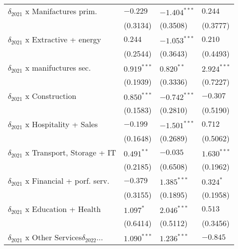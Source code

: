 \begin{tabular}{llll}
$\delta_{2021}$ x Manifactures prim.               &           $-0.229$ &     $-1.404^{***}$ &            $0.244$ \\
                                                   &           (0.3134) &           (0.3508) &           (0.3777) \\
$\delta_{2021}$ x Extractive + energy              &            $0.244$ &     $-1.053^{***}$ &            $0.210$ \\
                                                   &           (0.2544) &           (0.3643) &           (0.4493) \\
$\delta_{2021}$ x manifuctures sec.                &      $0.919^{***}$ &       $0.820^{**}$ &      $2.924^{***}$ \\
                                                   &           (0.1939) &           (0.3336) &           (0.7227) \\
$\delta_{2021}$ x Construction                     &      $0.850^{***}$ &     $-0.742^{***}$ &           $-0.307$ \\
                                                   &           (0.1583) &           (0.2810) &           (0.5190) \\
$\delta_{2021}$ x Hospitality + Sales              &           $-0.199$ &     $-1.501^{***}$ &            $0.712$ \\
                                                   &           (0.1648) &           (0.2689) &           (0.5062) \\
$\delta_{2021}$ x Transport, Storage + IT          &       $0.491^{**}$ &           $-0.035$ &      $1.630^{***}$ \\
                                                   &           (0.2185) &           (0.6508) &           (0.1962) \\
$\delta_{2021}$ x Financial + porf. serv.          &           $-0.379$ &      $1.385^{***}$ &          $0.324^*$ \\
                                                   &           (0.3155) &           (0.1895) &           (0.1958) \\
$\delta_{2021}$ x Education + Health               &          $1.097^*$ &      $2.046^{***}$ &            $0.513$ \\
                                                   &           (0.6414) &           (0.5112) &           (0.3456) \\
$\delta_{2021}$ x Other Services$\delta_{2022}$... &      $1.090^{***}$ &      $1.236^{***}$ &           $-0.845$ \\

\end{tabular}
